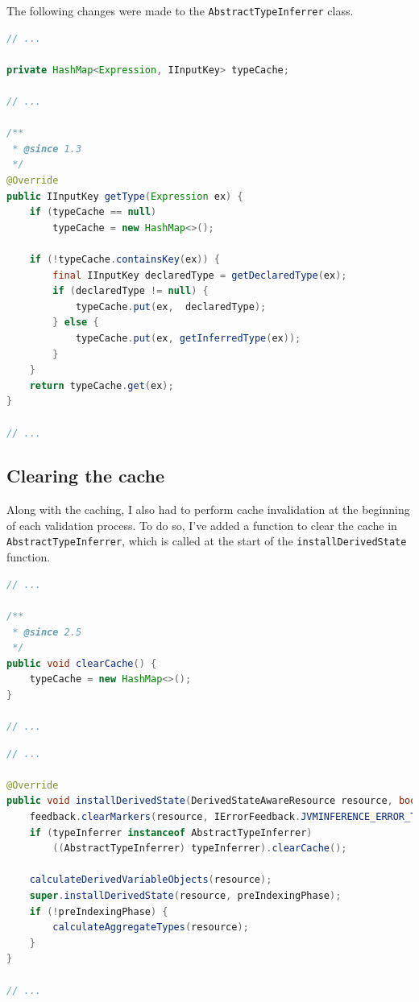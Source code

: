\documentclass[11pt,a4paper,oneside]{report}
\begin{document}
The following changes were made to the \texttt{AbstractTypeInferrer} class.

\begin{lstlisting}[language=java]
// ...

private HashMap<Expression, IInputKey> typeCache;

// ...

/**
 * @since 1.3
 */
@Override
public IInputKey getType(Expression ex) {
    if (typeCache == null)
        typeCache = new HashMap<>();

    if (!typeCache.containsKey(ex)) {
        final IInputKey declaredType = getDeclaredType(ex);
        if (declaredType != null) {
            typeCache.put(ex,  declaredType);
        } else {
            typeCache.put(ex, getInferredType(ex));
        }
    }
    return typeCache.get(ex);
}

// ...
\end{lstlisting}

\subsection{Clearing the cache}
Along with the caching, I also had to perform cache invalidation at the
beginning of each validation process. To do so, I've added a function to clear
the cache in \texttt{AbstractTypeInferrer}, which is called at the start of the
\texttt{installDerivedState} function.

\begin{lstlisting}[language=java]
// ...

/**
 * @since 2.5
 */
public void clearCache() {
    typeCache = new HashMap<>();
}

// ...
\end{lstlisting}

\begin{lstlisting}[language=java]
// ...

@Override
public void installDerivedState(DerivedStateAwareResource resource, boolean preIndexingPhase) {
    feedback.clearMarkers(resource, IErrorFeedback.JVMINFERENCE_ERROR_TYPE);
    if (typeInferrer instanceof AbstractTypeInferrer)
        ((AbstractTypeInferrer) typeInferrer).clearCache();

    calculateDerivedVariableObjects(resource);
    super.installDerivedState(resource, preIndexingPhase);
    if (!preIndexingPhase) {
        calculateAggregateTypes(resource);
    }
}

// ...
\end{lstlisting}
\end{document}
